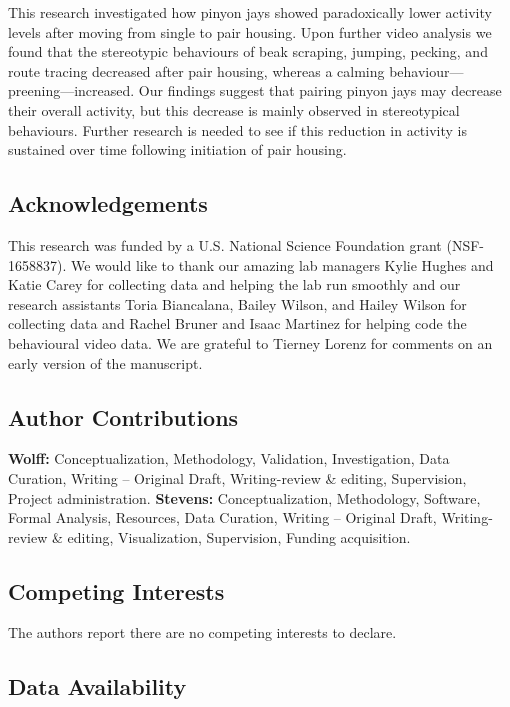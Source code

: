 \documentclass[
  pub]{apa6}
\begin{document}
This research investigated how pinyon jays showed paradoxically lower activity levels after moving from single to pair housing. Upon further video analysis we found that the stereotypic behaviours of beak scraping, jumping, pecking, and route tracing decreased after pair housing, whereas a calming behaviour---preening---increased. Our findings suggest that pairing pinyon jays may decrease their overall activity, but this decrease is mainly observed in stereotypical behaviours. Further research is needed to see if this reduction in activity is sustained over time following initiation of pair housing.

\subsection{Acknowledgements}\label{acknowledgements}

This research was funded by a U.S. National Science Foundation grant (NSF-1658837). We would like to thank our amazing lab managers Kylie Hughes and Katie Carey for collecting data and helping the lab run smoothly and our research assistants Toria Biancalana, Bailey Wilson, and Hailey Wilson for collecting data and Rachel Bruner and Isaac Martinez for helping code the behavioural video data. We are grateful to Tierney Lorenz for comments on an early version of the manuscript.

\subsection{Author Contributions}\label{author-contributions}

\textbf{Wolff:} Conceptualization, Methodology, Validation, Investigation, Data Curation, Writing -- Original Draft, Writing-review \& editing, Supervision, Project administration. \textbf{Stevens:} Conceptualization, Methodology, Software, Formal Analysis, Resources, Data Curation, Writing -- Original Draft, Writing-review \& editing, Visualization, Supervision, Funding acquisition.

\subsection{Competing Interests}\label{competing-interests}

The authors report there are no competing interests to declare.

\subsection{Data Availability}\label{data-availability}
\end{document}
